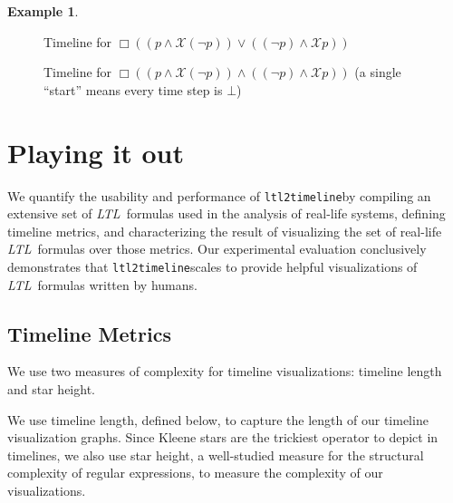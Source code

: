 \documentclass[conference]{IEEEtran}
\theoremstyle{definition}
\newtheorem{example}{Example}[section]
\theoremstyle{remark}
\newcommand{\always}{\Box}
\newcommand{\nextt}{\mathcal{X}}
\newcommand{\ltl}{\textit{LTL}}
\newcommand{\tool}{\hspace{0.1cm}\texttt{ltl2timeline}}
\begin{document}
\begin{example}
\begin{figure}[!h]
  \caption{Timeline for $\always ((p \land \nextt (\lnot p)) \lor ((\lnot p) \land \nextt p))$}
  \label{fig:oscillates1}
\end{figure}
\begin{figure}[!h]
  \centering
  \caption{Timeline for $\always ((p \land \nextt (\lnot p)) \land ((\lnot p) \land \nextt p))$ (a single ``start'' means every time step is $\bot$)}
  \label{fig:oscillates2}
\end{figure}
\end{example}

\section{Playing it out} \label{sec:playing}%

We quantify the usability and performance of \tool by compiling an extensive set of \ltl\ formulas used in the analysis of real-life systems, defining timeline metrics, and characterizing the result of visualizing the set of real-life \ltl\ formulas over those metrics.
Our experimental evaluation conclusively demonstrates that \tool scales to provide helpful visualizations of \ltl\ formulas written by humans.


\subsection{Timeline Metrics}
\label{sec:metrics}


We use two measures of complexity for timeline visualizations: timeline length and star height.

We use timeline length, defined below, to capture the length of our timeline visualization graphs. Since Kleene stars are the trickiest operator to depict in timelines, we also use star height, a well-studied measure for the structural complexity of regular expressions, to measure the complexity of our visualizations.
\end{document}
